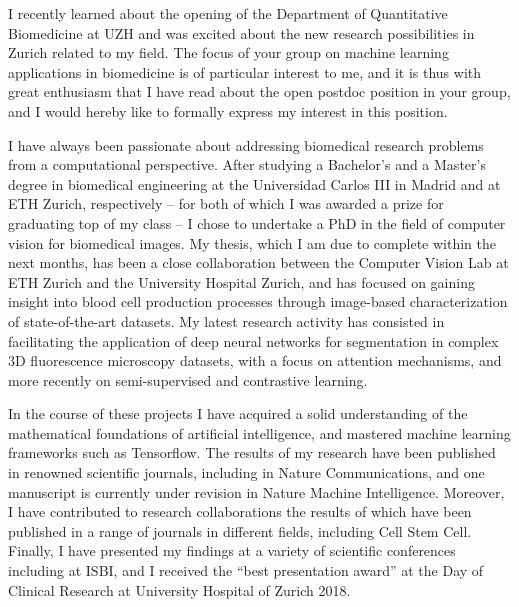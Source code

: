 \documentclass[10pt, letter]{ag-cv} %
\begin{document}
\makecvheader %

\makelettertitle %


\begin{cvletter}






\begin{flushleft}

I recently learned about the opening of the Department of Quantitative Biomedicine at UZH and was excited about the new research possibilities in Zurich related to my field. The focus of your group on machine learning applications in biomedicine is of particular interest to me, and it is thus with great enthusiasm that I have read about the open postdoc position in your group, and I would hereby like to formally express my interest in this position.

I have always been passionate about addressing biomedical research problems from a computational perspective. After studying a Bachelor’s and a Master’s  degree in biomedical engineering at the Universidad Carlos III in Madrid and at ETH Zurich, respectively – for both of which I was awarded a prize for graduating top of my class – I chose to undertake a PhD in the field of computer vision for biomedical images. My thesis, which I am due to complete within the next months, has been a close collaboration between the Computer Vision Lab at ETH Zurich and the University Hospital Zurich, and has focused on gaining insight into blood cell production processes through image-based characterization of state-of-the-art datasets. My latest research activity has consisted in facilitating the application of deep neural networks for segmentation in complex 3D fluorescence microscopy datasets, with a focus on attention mechanisms, and more recently on semi-supervised and contrastive learning.

In the course of these projects I have acquired a solid understanding of the mathematical foundations of artificial intelligence, and mastered machine learning frameworks such as Tensorflow. The results of my research have been published in renowned scientific journals, including in Nature Communications, and one manuscript is currently under revision in Nature Machine Intelligence. Moreover, I have contributed to research collaborations the results of which have been published in a range of journals in different fields, including Cell Stem Cell. Finally, I have presented my findings at a variety of scientific conferences including at ISBI, and I received the “best presentation award” at the Day of Clinical Research at University Hospital of Zurich 2018.


\end{flushleft}
\end{cvletter}
\end{document}
